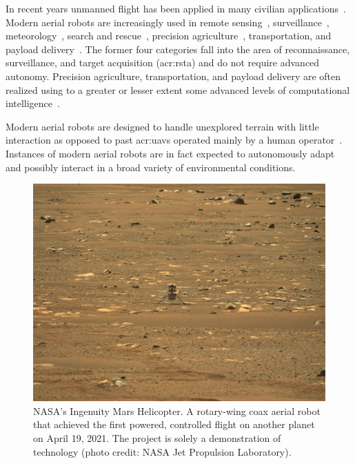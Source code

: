 In recent years unmanned flight has been applied in many civilian applications~\citep{gonzalez2017unmanned}. Modern aerial robots are increasingly used in remote sensing~\citep{noor2018remote,tang2015drone,milas2018drones}, surveillance~\citep{paucar2018use,burkle2009collaborating}, meteorology~\citep{schuyler2019using}, search and rescue~\citep{pensieri2020drones,karaca2018potential,cui2015drones,seguin2018unmanned}, precision agriculture~\citep{daponte2019review,puri2017agriculture}, transportation, and payload delivery~\citep{kellermann2020drones}. The former four categories fall into the area of reconnaissance, surveillance, and target acquisition (\Gls{acr:rsta}) and do not require advanced autonomy. Precision agriculture, transportation, and payload delivery are often realized using to a greater or lesser extent some advanced levels of computational intelligence~\citep{siciliano2016springer}. 

Modern aerial robots are designed to handle unexplored terrain with little interaction as opposed to past \Gls{acr:uav}s operated mainly by a human operator~\citep{siciliano2016springer}. Instances of modern aerial robots are in fact expected to autonomously adapt and possibly interact in a broad variety of environmental conditions. 

\begin{figure}[t]
  \centering
  \includegraphics[width=.7\textwidth]{pictures/jpegPIA24550}
  \caption[NASA's Ingenuity Mars Helicopter]{NASA's Ingenuity Mars Helicopter. A rotary-wing coax aerial robot that achieved the first powered, controlled flight on another planet on April 19, 2021. The project is solely a demonstration of technology {\scriptsize(photo credit: NASA Jet Propulsion Laboratory)}.}   
  \label{fig:ingenuity}
\end{figure}

